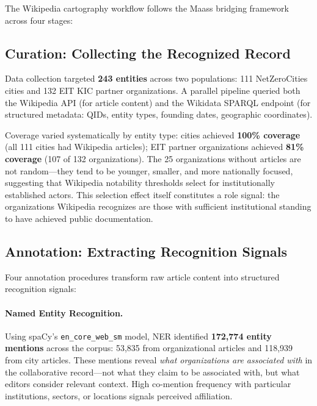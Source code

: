 \documentclass[../main.tex]{subfiles}
\begin{document}
The Wikipedia cartography workflow follows the Maass bridging framework \parencite{maass2018data} across four stages:

\subsection{Curation: Collecting the Recognized Record}

Data collection targeted \textbf{243 entities} across two populations: 111 NetZeroCities cities and 132 EIT KIC partner organizations. A parallel pipeline queried both the Wikipedia API (for article content) and the Wikidata SPARQL endpoint (for structured metadata: QIDs, entity types, founding dates, geographic coordinates).

Coverage varied systematically by entity type: cities achieved \textbf{100\% coverage} (all 111 cities had Wikipedia articles); EIT partner organizations achieved \textbf{81\% coverage} (107 of 132 organizations). The 25 organizations without articles are not random---they tend to be younger, smaller, and more nationally focused, suggesting that Wikipedia notability thresholds select for institutionally established actors. This selection effect itself constitutes a role signal: the organizations Wikipedia recognizes are those with sufficient institutional standing to have achieved public documentation.

\subsection{Annotation: Extracting Recognition Signals}

Four annotation procedures transform raw article content into structured recognition signals:

\paragraph{Named Entity Recognition.} Using spaCy's \texttt{en\_core\_web\_sm} model, NER identified \textbf{172,774 entity mentions} across the corpus: 53,835 from organizational articles and 118,939 from city articles. These mentions reveal \emph{what organizations are associated with} in the collaborative record---not what they claim to be associated with, but what editors consider relevant context. High co-mention frequency with particular institutions, sectors, or locations signals perceived affiliation.
\end{document}
